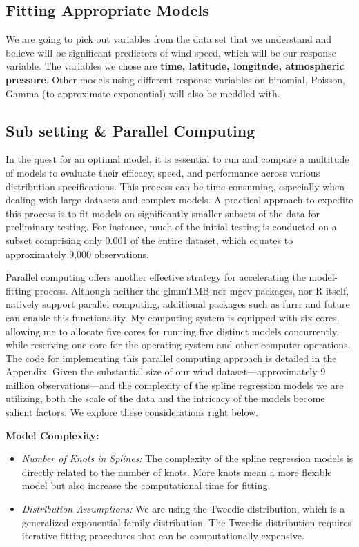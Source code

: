 \subsection{Fitting Appropriate Models}

We are going to pick out variables from the data set that we understand and believe will be significant predictors of wind speed, which will be our response variable. The variables we chose are \textbf{time, latitude, longitude, atmospheric pressure}. Other models using different response variables on binomial, Poisson, Gamma (to approximate exponential) will also be meddled with. 

\subsection{Sub setting \& Parallel Computing}
In the quest for an optimal model, it is essential to run and compare a multitude of models to evaluate their efficacy, speed, and performance across various distribution specifications. This process can be time-consuming, especially when dealing with large datasets and complex models. A practical approach to expedite this process is to fit models on significantly smaller subsets of the data for preliminary testing. For instance, much of the initial testing is conducted on a subset comprising only 0.001 of the entire dataset, which equates to approximately 9,000 observations.  
\newline

Parallel computing offers another effective strategy for accelerating the model-fitting process. Although neither the glmmTMB nor mgcv packages, nor R itself, natively support parallel computing, additional packages such as furrr and future can enable this functionality. My computing system is equipped with six cores, allowing me to allocate five cores for running five distinct models concurrently, while reserving one core for the operating system and other computer operations. The code for implementing this parallel computing approach is detailed in the Appendix. Given the substantial size of our wind dataset—approximately 9 million observations—and the complexity of the spline regression models we are utilizing, both the scale of the data and the intricacy of the models become salient factors. We explore these considerations right below.

\textbf{Model Complexity:}
\begin{itemize}
    \item \textit{Number of Knots in Splines:} The complexity of the spline regression models is directly related to the number of knots. More knots mean a more flexible model but also increase the computational time for fitting.
    
    \item \textit{Distribution Assumptions:} We are using the Tweedie distribution, which is a generalized exponential family distribution. The Tweedie distribution requires iterative fitting procedures that can be computationally expensive.
\end{itemize}

